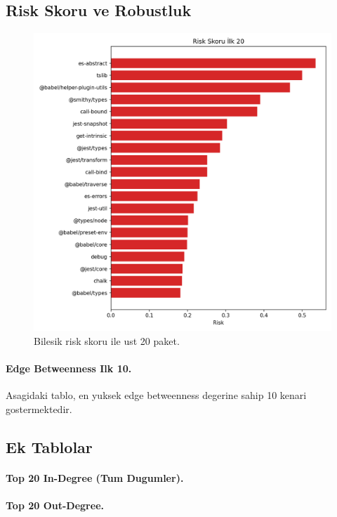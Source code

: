 \documentclass[11pt,a4paper]{article}
\begin{document}
\subsection{Risk Skoru ve Robustluk}
\begin{figure}[h]
  \centering
  \includegraphics[width=0.75\linewidth]{top20_risk.png}
  \caption{Bilesik risk skoru ile ust 20 paket.}
\end{figure}

\paragraph{Edge Betweenness Ilk 10.} Asagidaki tablo, en yuksek edge betweenness degerine sahip 10 kenari gostermektedir.

\subsection{Ek Tablolar}
\paragraph{Top 20 In-Degree (Tum Dugumler).}

\paragraph{Top 20 Out-Degree.}
\end{document}

